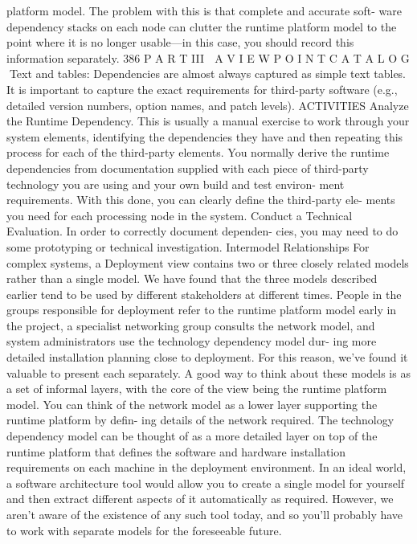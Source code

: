 platform model. The problem with this is that complete and accurate soft-
ware dependency stacks on each node can clutter the runtime platform
model to the point where it is no longer usable—in this case, you should
record this information separately.
386
 P A R T III  A V I E W P O I N T C A T A L O G
Text and tables: Dependencies are almost always captured as simple text
tables. It is important to capture the exact requirements for third-party
software (e.g., detailed version numbers, option names, and patch levels).
ACTIVITIES
Analyze the Runtime Dependency. This is usually a manual exercise to work
through your system elements, identifying the dependencies they have and
then repeating this process for each of the third-party elements. You normally
derive the runtime dependencies from documentation supplied with each piece
of third-party technology you are using and your own build and test environ-
ment requirements. With this done, you can clearly define the third-party ele-
ments you need for each processing node in the system.
Conduct a Technical Evaluation. In order to correctly document dependen-
cies, you may need to do some prototyping or technical investigation.
Intermodel Relationships
For complex systems, a Deployment view contains two or three closely related
models rather than a single model. We have found that the three models
described earlier tend to be used by different stakeholders at different times.
People in the groups responsible for deployment refer to the runtime platform
model early in the project, a specialist networking group consults the network
model, and system administrators use the technology dependency model dur-
ing more detailed installation planning close to deployment. For this reason,
we’ve found it valuable to present each separately.
A good way to think about these models is as a set of informal layers,
with the core of the view being the runtime platform model. You can think of
the network model as a lower layer supporting the runtime platform by defin-
ing details of the network required. The technology dependency model can be
thought of as a more detailed layer on top of the runtime platform that defines
the software and hardware installation requirements on each machine in the
deployment environment.
In an ideal world, a software architecture tool would allow you to create a
single model for yourself and then extract different aspects of it automatically as
required. However, we aren’t aware of the existence of any such tool today, and
so you’ll probably have to work with separate models for the foreseeable future.
